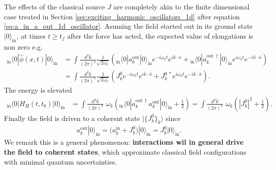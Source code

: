 \documentclass[../QFT_main.tex]{subfiles}
\begin{document}
\begin{mytheorem}
The effects of the classical source $J$ are completely akin to the finite dimensional case treated in Section \ref{sec:exciting_harmonic_oscillators_1d} after equation \eqref{eq:a_in_a_out_1d_oscillator}.
Asuming the field started out in its ground state $|0\rangle_{\mathrm{in}}$, at times $t\geq t_f$ after the force has acted, the expected value of elongations is non zero e.g.
\begin{align}
    {}_{\mathrm{in}}\langle 0 | \hat{\phi}(x,t) | 0 \rangle_{\mathrm{in}} &= \int \frac{d^3\bar{k}}{(2\pi)^3} \frac{1}{\sqrt{2\omega_k}} \left( {}_{\mathrm{in}}\langle 0 | a_k^{\mathrm{out}} | 0 \rangle_{\mathrm{in}} e^{-i \omega_k t} e^{i \bar{k}\cdot\bar{x}} + {}_{\mathrm{in}}\langle 0 | a_k^{\mathrm{out}\,\dagger} | 0 \rangle_{\mathrm{in}} e^{i \omega_k t} e^{- i \bar{k}\cdot{\bar{x}}} \right)\\
    &= \int \frac{d^3\bar{k}}{(2\pi)^3} \frac{1}{\sqrt{2\omega_k}} \left( J_k^{0} e^{-i \omega_k t} e^{i \bar{k}\cdot\bar{x}} + J_k^{0\,*} e^{i \omega_k t} e^{- i \bar{k}\cdot{\bar{x}}} \right).
\end{align} 
The energy is elevated 
\begin{align}
    {}_{\mathrm{in}}\langle 0 | H_H(t,t_0)|0\rangle_{\mathrm{in}} &= \int \frac{d^3\bar{k}}{(2\pi)^3} \,\,\omega_k \left( {}_{\mathrm{in}}\langle 0 | a_k^{\mathrm{out}\,\dagger} a_k^{\mathrm{out}} |0\rangle_{\mathrm{in}} + \tfrac{1}{2} \right)
    = \int \frac{d^3\bar{k}}{(2\pi)^3} \,\,\omega_k \left( |J_k^{0}|^2 + \tfrac{1}{2} \right). 
\end{align}
Finally the field is driven to a coherent state $|\{J_k^{0}\}_k\rangle$ since 
\begin{align}
    a_k^{\mathrm{out}} |0\rangle_{\mathrm{in}} = \big(a_k^{\mathrm{in}}+J_k^0\big)|0\rangle_{\mathrm{in}} = J_k^0 |0\rangle_{\mathrm{in}}.
\end{align}
We remark this is a general phenomenon: \textbf{interactions wil in general drive the field to coherent states}, which approximate classical field configurations with minimal quantum uncertainties.
%
\end{mytheorem}
\end{document}
